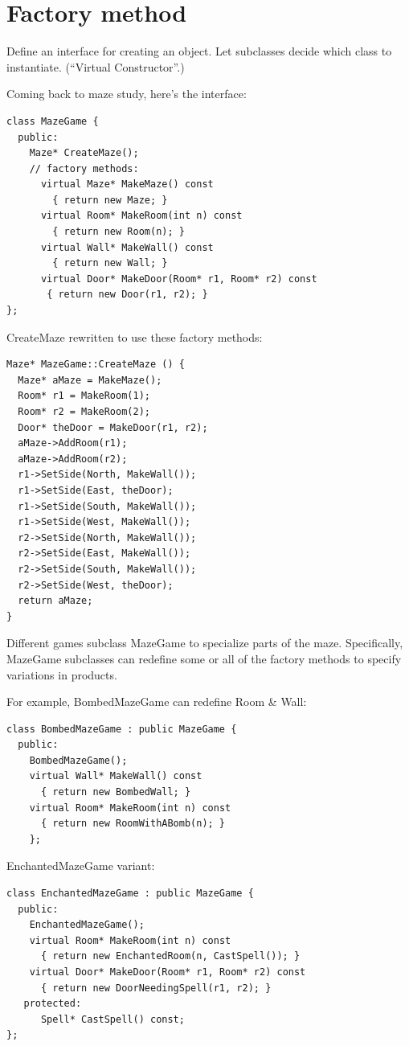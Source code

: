 \documentclass[11pt]{report}
\begin{document}
\section{Factory method}

Define an interface for creating an object. Let subclasses decide 
which class to instantiate. (``Virtual Constructor''.)

Coming back to maze study, here's the interface:
\begin{lstlisting}
class MazeGame {
  public:
    Maze* CreateMaze();
    // factory methods:
      virtual Maze* MakeMaze() const
        { return new Maze; }
      virtual Room* MakeRoom(int n) const
        { return new Room(n); }
      virtual Wall* MakeWall() const
        { return new Wall; }
      virtual Door* MakeDoor(Room* r1, Room* r2) const
       { return new Door(r1, r2); }
};
\end{lstlisting}

CreateMaze rewritten to use these factory methods:
\begin{lstlisting}
Maze* MazeGame::CreateMaze () {
  Maze* aMaze = MakeMaze();
  Room* r1 = MakeRoom(1);
  Room* r2 = MakeRoom(2);
  Door* theDoor = MakeDoor(r1, r2);
  aMaze->AddRoom(r1);
  aMaze->AddRoom(r2);
  r1->SetSide(North, MakeWall());
  r1->SetSide(East, theDoor);
  r1->SetSide(South, MakeWall());
  r1->SetSide(West, MakeWall());
  r2->SetSide(North, MakeWall());
  r2->SetSide(East, MakeWall());
  r2->SetSide(South, MakeWall());
  r2->SetSide(West, theDoor);
  return aMaze;
}
\end{lstlisting}

Different games subclass MazeGame to specialize parts of the maze. 
Specifically, MazeGame subclasses can redefine some or all 
of the factory methods to specify variations in products. 

For example, BombedMazeGame can redefine Room \& Wall:
\begin{lstlisting}
class BombedMazeGame : public MazeGame {
  public:
    BombedMazeGame();
    virtual Wall* MakeWall() const
      { return new BombedWall; }
    virtual Room* MakeRoom(int n) const
      { return new RoomWithABomb(n); }
    };
\end{lstlisting}

EnchantedMazeGame variant:
\begin{lstlisting}
class EnchantedMazeGame : public MazeGame {
  public:
    EnchantedMazeGame();
    virtual Room* MakeRoom(int n) const
      { return new EnchantedRoom(n, CastSpell()); }
    virtual Door* MakeDoor(Room* r1, Room* r2) const
      { return new DoorNeedingSpell(r1, r2); }
   protected:
      Spell* CastSpell() const;
};
\end{lstlisting}
\end{document}
